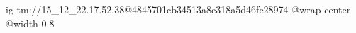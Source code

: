  
 
 
 
 

\qqSecOrig


\ifcmt
  ig tm://15_12_22.17.52.38@4845701cb34513a8c318a5d46fe28974
  @wrap center
  @width 0.8
\fi

